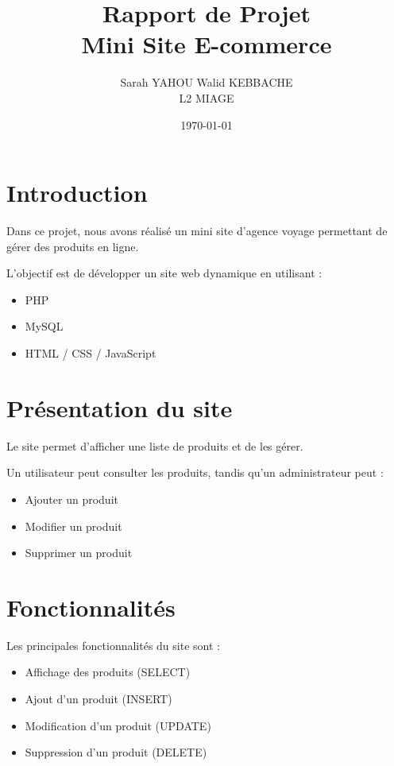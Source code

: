\documentclass[a4paper,12pt]{article}
\title{Rapport de Projet \\ Mini Site E-commerce}
\author{Sarah YAHOU Walid KEBBACHE \\ L2 MIAGE}
\date{\today}
\begin{document}
\maketitle

\tableofcontents
\newpage

\section{Introduction}

Dans ce projet, nous avons réalisé un mini site d'agence voyage permettant de gérer des produits en ligne.

L’objectif est de développer un site web dynamique en utilisant :
\begin{itemize}
    \item PHP
    \item MySQL
    \item HTML / CSS / JavaScript
\end{itemize}

\section{Présentation du site}

Le site permet d’afficher une liste de produits et de les gérer.

Un utilisateur peut consulter les produits, tandis qu’un administrateur peut :
\begin{itemize}
    \item Ajouter un produit
    \item Modifier un produit
    \item Supprimer un produit
\end{itemize}

\section{Fonctionnalités}

Les principales fonctionnalités du site sont :

\begin{itemize}
    \item Affichage des produits (SELECT)
    \item Ajout d’un produit (INSERT)
    \item Modification d’un produit (UPDATE)
    \item Suppression d’un produit (DELETE)
\end{itemize}
\end{document}
